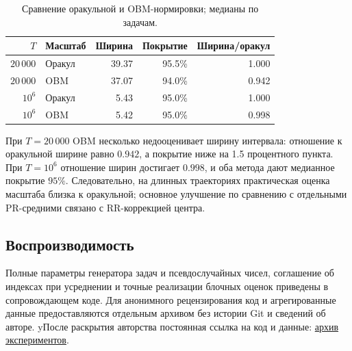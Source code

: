 \documentclass[blind]{psta}
\makeatletter
\newcommand{\AfterPeer}[1]{\if y\psta@blind\else#1\fi}
\makeatother
\begin{document}
\begin{table}
\footnotesize
\setlength{\tabcolsep}{3pt}
\renewcommand{\arraystretch}{1.15}
\caption{Сравнение оракульной и OBM-нормировки; медианы по задачам.}
\label{tab:oracle}
\centering
\begin{tabular}{|r|l|r|r|r|}
\hline
$T$ & Масштаб & Ширина & Покрытие & Ширина/оракул \\
\hline
$20\,000$ & Оракул & 39.37 & 95.5\% & 1.000 \\
$20\,000$ & OBM    & 37.07 & 94.0\% & 0.942 \\
$10^6$    & Оракул & 5.43  & 95.0\% & 1.000 \\
$10^6$    & OBM    & 5.42  & 95.0\% & 0.998 \\
\hline
\end{tabular}
\end{table}

При $T=20\,000$ OBM несколько недооценивает ширину интервала: отношение к
оракульной ширине равно $0.942$, а покрытие ниже на 1.5 процентного пункта.
При $T=10^6$ отношение ширин достигает $0.998$, и оба метода дают медианное
покрытие $95\%$. Следовательно, на длинных траекториях практическая оценка
масштаба близка к оракульной; основное улучшение по сравнению с отдельными
PR-средними связано с RR-коррекцией центра.

\subsection{Воспроизводимость}

Полные параметры генератора задач и псевдослучайных чисел, соглашение об
индексах при усреднении и точные реализации блочных оценок приведены в
сопровождающем коде.
Для анонимного рецензирования код и агрегированные данные предоставляются
отдельным архивом без истории Git и сведений об авторе.
\AfterPeer{После раскрытия авторства постоянная ссылка на код и данные:
\href{https://github.com/Eviltsundera/Statistical-inference-for-Linear-Stochastic-Approximation-with-Richardson-Romberg-extrapolation/tree/1d7e4d7914c1b0f4c0c5c840418e250e21ae75b5/code/results}
{архив экспериментов}.}
\end{document}
